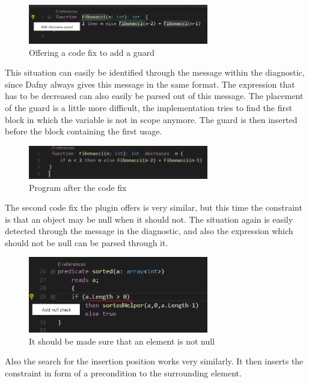 \begin{figure}[H]
	\centering
	\includegraphics[width=0.7\textwidth]{img/decreaseGuard}
	\caption{Offering a code fix to add a guard}
	\label{fig:decreaseguard}
\end{figure}
This situation can easily be identified through the message within the diagnostic, since Dafny always gives this message in the same format. The expression that has to be decreased can also easily be parsed out of this message. The placement of the guard is a little more difficult, the implementation tries to find the first block in which the variable is not in scope anymore. The guard is then inserted before the block containing the first usage. \newline
\begin{figure}[H]
	\centering
	\includegraphics[width=0.7\textwidth]{img/decreaseGuardApplied}
	\caption{Program after the code fix}
	\label{fig:decreaseguardapplied}
\end{figure}
The second code fix the plugin offers is very similar, but this time the constraint is that an object may be null when it should not. The situation again is easily detected through the message in the diagnostic, and also the expression which should not be null can be parsed through it.
\begin{figure}[H]
	\centering
	\includegraphics[width=0.7\textwidth]{img/nullCheck}
	\caption{It should be made sure that an element is not null}
	\label{fig:nullcheck}
\end{figure}
Also the search for the insertion position works very similarly. It then inserts the constraint in form of a precondition to the surrounding element. \newline
